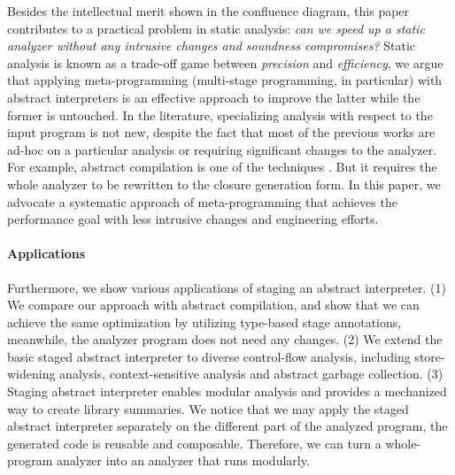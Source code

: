 Besides the intellectual merit shown in the confluence diagram, this paper
contributes to a practical problem in static analysis: \textit{can we speed up a
static analyzer without any intrusive changes and soundness compromises?} Static
analysis is known as a trade-off game between \textit{precision} and
\textit{efficiency}, we argue that applying meta-programming (multi-stage
programming, in particular) with abstract interpreters is an effective approach
to improve the latter while the former is untouched.
In the literature, specializing analysis with respect to the input program
\cite{damian1999partial, amtoft1999partial, Boucher:1996:ACN:647473.727587,
ashley:practical} is not new, despite the fact that most of the previous works
are ad-hoc on a particular analysis or requiring significant changes to the
analyzer. For example, abstract compilation is one of the techniques
\cite{Boucher:1996:ACN:647473.727587}. But it requires the whole analyzer to be
rewritten to the closure generation form. In this paper, we advocate a systematic
approach of meta-programming that achieves the performance goal with less
intrusive changes and engineering efforts.

\paragraph{Applications}

Furthermore, we show various applications of staging an abstract interpreter.
(1) We compare our approach with abstract compilation, and show that we can
achieve the same optimization by utilizing type-based stage annotations,
meanwhile, the analyzer program does not need any changes. (2) We extend the basic staged abstract interpreter to diverse control-flow analysis, including store-widening analysis, context-sensitive analysis and abstract garbage collection.
(3) Staging abstract interpreter enables modular analysis and provides a mechanized
way to create library summaries. We notice that we may apply the staged abstract
interpreter separately on the different part of the analyzed program, the
generated code is reusable and composable. Therefore, we can turn a
whole-program analyzer into an analyzer that runs modularly.

